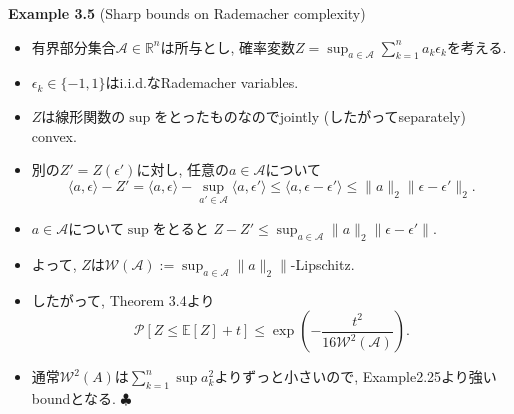 \documentclass[aspectratio=169, dvipdfmx]{beamer}
\def\endexample{\hfill $\clubsuit$}
\newcommand{\ex}{\mathbb{E}}
\begin{document}
\begin{frame}{}{}
{\bf Example 3.5} (Sharp bounds on Rademacher complexity)
    \begin{itemize}
        \item 有界部分集合$\mathcal{A}\in\mathbb{R}^n$は所与とし,
        確率変数$Z = \sup_{a\in\mathcal{A}}\sum_{k=1}^na_k\epsilon_k$を考える.
        \item $\epsilon_k \in \{ -1,1\}$はi.i.d.なRademacher variables.
        \item $Z$は線形関数の$\sup$をとったものなのでjointly (したがってseparately) convex.
        \item 別の$Z' = Z(\epsilon')$に対し, 任意の$a\in\mathcal{A}$について
        \[
            \langle a,\epsilon\rangle - Z'
            = \langle a,\epsilon\rangle - \sup_{a'\in\mathcal{A}}\langle a,\epsilon'\rangle
            \le \langle a, \epsilon-\epsilon'\rangle
            \le \|a\|_2 \|\epsilon-\epsilon'\|_2.
        \]
        \item $a\in \mathcal{A}$について$\sup$をとると
        $Z-Z' \le \sup_{a\in\mathcal{A}}\|a\|_2\|\epsilon-\epsilon'\|$.
        \item よって, $Z$は$\mathcal{W}(\mathcal{A}):=\sup_{a\in\mathcal{A}}\|a\|_2\|$-Lipschitz.
        \item したがって, Theorem 3.4より
        \[ \mathcal{P}[Z \le \ex[Z]+t] \le \exp\left(-\frac{t^2}{16\mathcal{W}^2(\mathcal{A})}\right).
        \tag{3.17}\label{3.17}\]
        \item 通常$\mathcal{W}^2(A)$は$\sum_{k=1}^n\sup a_k^2$よりずっと小さいので, Example2.25より強いboundとなる.
        \endexample
    \end{itemize}
\end{frame}
\end{document}
